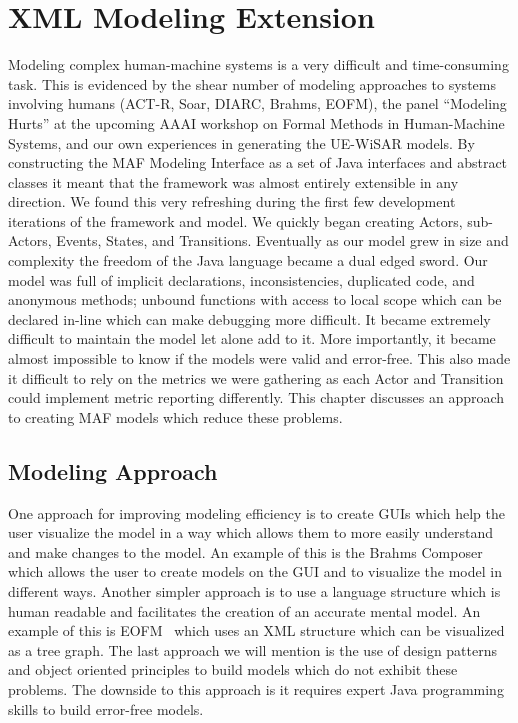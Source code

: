 \chapter{XML Modeling Extension}

Modeling complex human-machine systems is a very difficult and time-consuming task.  This is evidenced by the shear number of modeling approaches to systems involving humans (ACT-R, Soar, DIARC, Brahms, EOFM), the panel ``Modeling Hurts'' at the upcoming AAAI workshop on Formal Methods in Human-Machine Systems, and our own experiences in generating the UE-WiSAR models.  By constructing the MAF Modeling Interface as a set of Java interfaces and abstract classes it meant that the framework was almost entirely extensible in any direction.  We found this very refreshing during the first few development iterations of the framework and model.  We quickly began creating Actors, sub-Actors, Events, States, and Transitions.  Eventually as our model grew in size and complexity the freedom of the Java language became a dual edged sword.  Our model was full of implicit declarations, inconsistencies, duplicated code, and anonymous methods; unbound functions with access to local scope which can be declared in-line which can make debugging more difficult.  It became extremely difficult to maintain the model let alone add to it.  More importantly, it became almost impossible to know if the models were valid and error-free.  This also made it difficult to rely on the metrics we were gathering as each Actor and Transition could implement metric reporting differently.  This chapter discusses an approach to creating MAF models which reduce these problems.

\section{Modeling Approach}

One approach for improving modeling efficiency is to create GUIs which help the user visualize the model in a way which allows them to more easily understand and make changes to the model.  An example of this is the Brahms Composer~\cite{seah2005multi} which allows the user to create models on the GUI and to visualize the model in different ways.  Another simpler approach is to use a language structure which is human readable and facilitates the creation of an accurate mental model.  An example of this is EOFM~\cite{bolton2009enhanced} which uses an XML structure which can be visualized as a tree graph.  The last approach we will mention is the use of design patterns and object oriented principles to build models which do not exhibit these problems.  The downside to this approach is it requires expert Java programming skills to build error-free models.

